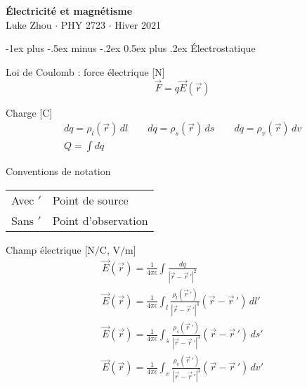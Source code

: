 \documentclass[10pt,landscape]{article}
\makeatletter
\renewcommand{\section}{\@startsection{section}{1}{0mm}%
                                {-1ex plus -.5ex minus -.2ex}%
                                {0.5ex plus .2ex}%
                                {\normalfont\large\bfseries}}
\newcommand{\extraline}{\vspace{1em}}
\newcommand{\halfline}{\vspace{0.5em}}
\newcommand{\tableindent}{\hspace{1.5em}}
\newcommand{\uvec}[1]{\ensuremath{\boldsymbol{\hat{#1}}}}
\makeatother
\begin{document}
\raggedright
\footnotesize
\begin{multicols}{3}

\setlength{\premulticols}{1pt}
\setlength{\postmulticols}{1pt}
\setlength{\multicolsep}{1pt}
\setlength{\columnsep}{2pt}

\begin{center}
     \Large{\textbf{Électricité et magnétisme}} \\
     \small{Luke Zhou $\cdot$ PHY 2723 $\cdot$ Hiver 2021}
\end{center}

\section{Électrostatique}

Loi de Coulomb : force électrique [\si{\newton}]
 \[ \vec{F} = q\vec{E}(\vec{r}) \] %

Charge  [\si{\coulomb}]
\begin{gather*} 
dq = \rho_l(\vec{r}) \,dl  \qquad  dq = \rho_s(\vec{r}) \,ds  \qquad dq = \rho_v(\vec{r}) \,dv  \\
 \textstyle Q = \int dq 
\end{gather*}

Conventions de notation  \\
\halfline
\begin{tabular}{@{\tableindent}ll@{}}
	Avec $'$ & Point de source\\
	Sans $'$ & Point d'observation \\
\end{tabular}

\extraline
Champ électrique [$\si{\newton/\coulomb}$, $\si{\volt/\metre}$]
\begin{gather*}
\vec{E}(\vec{r}) = \frac{1}{4\pi\epsilon} \int \frac{dq}{| \vec{r} - \vec{r}\,' |^2 }  \\
%
 \vec{E}(\vec{r}) = \frac{1}{4\pi\epsilon} \int_{l} \frac{\rho_l(\vec{r}\,')}{| \vec{r} - \vec{r}\,' |^3 } (\vec{r} - \vec{r}\,' )\,dl'  \\
%
\vec{E}(\vec{r}) = \frac{1}{4\pi\epsilon} \int_{s} \frac{\rho_s(\vec{r}\,')}{| \vec{r} - \vec{r}\,'|^3 } (\vec{r} - \vec{r}\,' )\,ds' \\
%
\vec{E}(\vec{r}) = \frac{1}{4\pi\epsilon} \int_{v} \frac{\rho_v(\vec{r}\,')}{| \vec{r} - \vec{r}\,' |^3 } (\vec{r} - \vec{r}\,' )\,dv'  
\end{gather*}
	

\end{multicols}
\end{document}
